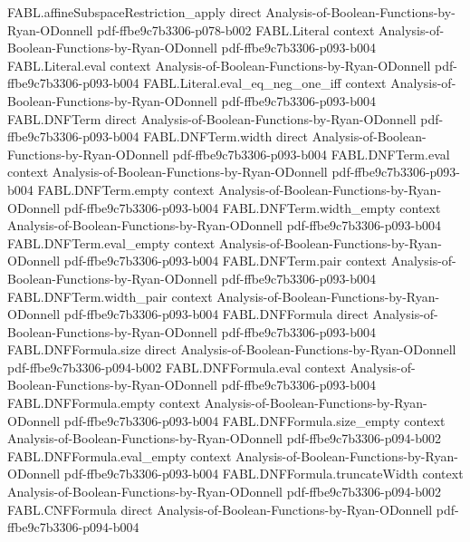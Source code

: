 \begin{theorem}
\proofstep
  {FABL.affineSubspaceRestriction_apply}
  {direct}
  {Analysis-of-Boolean-Functions-by-Ryan-ODonnell}
  {pdf-ffbe9c7b3306-p078-b002}
\proofstep
  {FABL.Literal}
  {context}
  {Analysis-of-Boolean-Functions-by-Ryan-ODonnell}
  {pdf-ffbe9c7b3306-p093-b004}
\proofstep
  {FABL.Literal.eval}
  {context}
  {Analysis-of-Boolean-Functions-by-Ryan-ODonnell}
  {pdf-ffbe9c7b3306-p093-b004}
\proofstep
  {FABL.Literal.eval_eq_neg_one_iff}
  {context}
  {Analysis-of-Boolean-Functions-by-Ryan-ODonnell}
  {pdf-ffbe9c7b3306-p093-b004}
\proofstep
  {FABL.DNFTerm}
  {direct}
  {Analysis-of-Boolean-Functions-by-Ryan-ODonnell}
  {pdf-ffbe9c7b3306-p093-b004}
\proofstep
  {FABL.DNFTerm.width}
  {direct}
  {Analysis-of-Boolean-Functions-by-Ryan-ODonnell}
  {pdf-ffbe9c7b3306-p093-b004}
\proofstep
  {FABL.DNFTerm.eval}
  {context}
  {Analysis-of-Boolean-Functions-by-Ryan-ODonnell}
  {pdf-ffbe9c7b3306-p093-b004}
\proofstep
  {FABL.DNFTerm.empty}
  {context}
  {Analysis-of-Boolean-Functions-by-Ryan-ODonnell}
  {pdf-ffbe9c7b3306-p093-b004}
\proofstep
  {FABL.DNFTerm.width_empty}
  {context}
  {Analysis-of-Boolean-Functions-by-Ryan-ODonnell}
  {pdf-ffbe9c7b3306-p093-b004}
\proofstep
  {FABL.DNFTerm.eval_empty}
  {context}
  {Analysis-of-Boolean-Functions-by-Ryan-ODonnell}
  {pdf-ffbe9c7b3306-p093-b004}
\proofstep
  {FABL.DNFTerm.pair}
  {context}
  {Analysis-of-Boolean-Functions-by-Ryan-ODonnell}
  {pdf-ffbe9c7b3306-p093-b004}
\proofstep
  {FABL.DNFTerm.width_pair}
  {context}
  {Analysis-of-Boolean-Functions-by-Ryan-ODonnell}
  {pdf-ffbe9c7b3306-p093-b004}
\proofstep
  {FABL.DNFFormula}
  {direct}
  {Analysis-of-Boolean-Functions-by-Ryan-ODonnell}
  {pdf-ffbe9c7b3306-p093-b004}
\proofstep
  {FABL.DNFFormula.size}
  {direct}
  {Analysis-of-Boolean-Functions-by-Ryan-ODonnell}
  {pdf-ffbe9c7b3306-p094-b002}
\proofstep
  {FABL.DNFFormula.eval}
  {context}
  {Analysis-of-Boolean-Functions-by-Ryan-ODonnell}
  {pdf-ffbe9c7b3306-p093-b004}
\proofstep
  {FABL.DNFFormula.empty}
  {context}
  {Analysis-of-Boolean-Functions-by-Ryan-ODonnell}
  {pdf-ffbe9c7b3306-p093-b004}
\proofstep
  {FABL.DNFFormula.size_empty}
  {context}
  {Analysis-of-Boolean-Functions-by-Ryan-ODonnell}
  {pdf-ffbe9c7b3306-p094-b002}
\proofstep
  {FABL.DNFFormula.eval_empty}
  {context}
  {Analysis-of-Boolean-Functions-by-Ryan-ODonnell}
  {pdf-ffbe9c7b3306-p093-b004}
\proofstep
  {FABL.DNFFormula.truncateWidth}
  {context}
  {Analysis-of-Boolean-Functions-by-Ryan-ODonnell}
  {pdf-ffbe9c7b3306-p094-b002}
\proofstep
  {FABL.CNFFormula}
  {direct}
  {Analysis-of-Boolean-Functions-by-Ryan-ODonnell}
  {pdf-ffbe9c7b3306-p094-b004}

\end{theorem}

